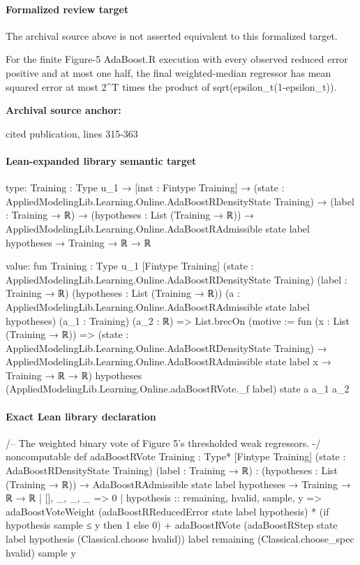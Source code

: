 \documentclass[10pt]{article}
\begin{document}
\paragraph{Formalized review target}
The archival source above is not asserted equivalent to this formalized target.
\begin{ReviewVerbatim}
For the finite Figure-5 AdaBoost.R execution with every observed reduced error positive and at most one half, the final weighted-median regressor has mean squared error at most 2^T times the product of sqrt(epsilon_t(1-epsilon_t)).
\end{ReviewVerbatim}

\textbf{Archival source anchor:} {\footnotesize\raggedright cited publication, lines 315-\allowbreak{}363\par}
\paragraph{Lean-expanded library semantic target}
\begin{ReviewVerbatim}
type:
{Training : Type u_1} →
  [inst : Fintype Training] →
    (state : AppliedModelingLib.Learning.Online.AdaBoostRDensityState Training) →
      (label : Training → ℝ) →
        (hypotheses : List (Training → ℝ)) →
          AppliedModelingLib.Learning.Online.AdaBoostRAdmissible state label hypotheses → Training → ℝ → ℝ

value:
fun {Training : Type u_1} [Fintype Training] (state : AppliedModelingLib.Learning.Online.AdaBoostRDensityState Training)
    (label : Training → ℝ) (hypotheses : List (Training → ℝ))
    (a : AppliedModelingLib.Learning.Online.AdaBoostRAdmissible state label hypotheses) (a_1 : Training) (a_2 : ℝ) =>
  List.brecOn (motive := fun (x : List (Training → ℝ)) =>
    (state : AppliedModelingLib.Learning.Online.AdaBoostRDensityState Training) →
      AppliedModelingLib.Learning.Online.AdaBoostRAdmissible state label x → Training → ℝ → ℝ)
    hypotheses (AppliedModelingLib.Learning.Online.adaBoostRVote._f label) state a a_1 a_2
\end{ReviewVerbatim}

\paragraph{Exact Lean library declaration}
\begin{ReviewVerbatim}
/-- The weighted binary vote of Figure 5's thresholded weak regressors. -/
noncomputable def adaBoostRVote
    {Training : Type*} [Fintype Training]
    (state : AdaBoostRDensityState Training) (label : Training → ℝ) :
    (hypotheses : List (Training → ℝ)) →
      AdaBoostRAdmissible state label hypotheses → Training → ℝ → ℝ
  | [], _, _, _ => 0
  | hypothesis :: remaining, hvalid, sample, y =>
      adaBoostVoteWeight (adaBoostRReducedError state label hypothesis) *
          (if hypothesis sample ≤ y then 1 else 0) +
        adaBoostRVote
          (adaBoostRStep state label hypothesis (Classical.choose hvalid)) label remaining
          (Classical.choose_spec hvalid) sample y
\end{ReviewVerbatim}
\end{document}

